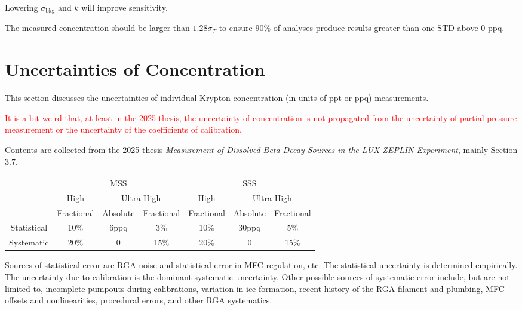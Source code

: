 \documentclass{article}
\begin{document}
Lowering $\sigma_\mathrm{bkg}$ and $k$ will improve sensitivity.

The measured concentration should be larger than $1.28\sigma_T$ to ensure 90\% of analyses produce results greater than one STD above 0 ppq.

\section{Uncertainties of Concentration}

This section discusses the uncertainties of individual Krypton concentration (in units of ppt or ppq) measurements.

\textcolor{red}{It is a bit weird that, at least in the 2025 thesis, the uncertainty of concentration is not propagated from the uncertainty of partial pressure measurement or the uncertainty of the coefficients of calibration.}

Contents are collected from the 2025 thesis \textit{Measurement of Dissolved Beta Decay Sources in the LUX-ZEPLIN Experiment}, mainly Section 3.7.

\begin{center}
{\footnotesize
\begin{tabular}{|c|c|c|c|c|c|c|} 
  \hline
  \multirow{3}{*}{} & \multicolumn{3}{|c|}{MSS} & \multicolumn{3}{|c|}{SSS} \\ 
  \cline{2-7}
   & High & \multicolumn{2}{|c|}{Ultra-High} & High & \multicolumn{2}{|c|}{Ultra-High} \\ 
  \cline{2-7}
   & Fractional & Absolute & Fractional & Fractional & Absolute & Fractional \\ 
  \hline
  Statistical & 10\% & 6ppq & 3\% & 10\% & 30ppq & 5\% \\ 
  \hline
  Systematic & 20\% & 0 & 15\% & 20\% & 0 & 15\% \\ 
  \hline
\end{tabular}
}
\end{center}

Sources of statistical error are RGA noise and statistical error in MFC regulation, etc. The statistical uncertainty is determined empirically. The uncertainty due to calibration is the dominant systematic uncertainty. Other possible sources of systematic error include, but are not limited to, incomplete pumpouts during calibrations, variation in ice formation, recent history of the RGA filament and plumbing, MFC offsets and nonlinearities, procedural errors, and other RGA  systematics.
\end{document}
